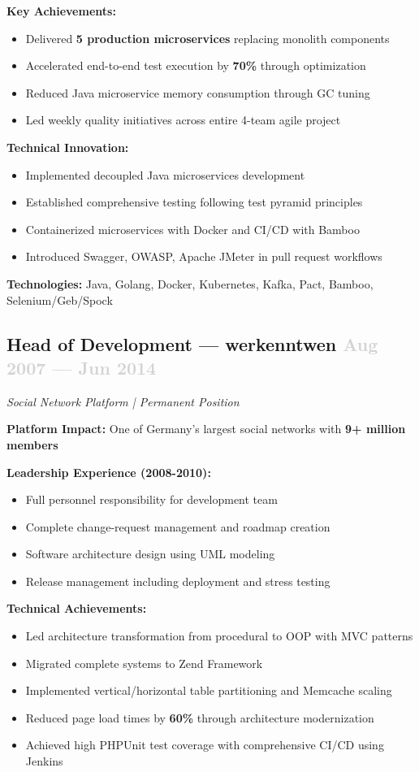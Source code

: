 \documentclass[11pt,a4paper]{article}
\begin{document}
\textbf{Key Achievements:}
\begin{itemize}
    \item Delivered \textbf{5 production microservices} replacing monolith components
    \item Accelerated end-to-end test execution by \textbf{70\%} through optimization
    \item Reduced Java microservice memory consumption through GC tuning
    \item Led weekly quality initiatives across entire 4-team agile project
\end{itemize}

\textbf{Technical Innovation:}
\begin{itemize}
    \item Implemented decoupled Java microservices development
    \item Established comprehensive testing following test pyramid principles
    \item Containerized microservices with Docker and CI/CD with Bamboo
    \item Introduced Swagger, OWASP, Apache JMeter in pull request workflows
\end{itemize}

\textbf{Technologies:} Java, Golang, Docker, Kubernetes, Kafka, Pact, Bamboo, Selenium/Geb/Spock

\subsection{Head of Development — werkenntwen \hfill \textcolor{lightgray}{Aug 2007 — Jun 2014}}
\textsl{Social Network Platform | Permanent Position}

\textbf{Platform Impact:} One of Germany's largest social networks with \textbf{9+ million members}

\textbf{Leadership Experience (2008-2010):}
\begin{itemize}
    \item Full personnel responsibility for development team
    \item Complete change-request management and roadmap creation
    \item Software architecture design using UML modeling
    \item Release management including deployment and stress testing
\end{itemize}

\textbf{Technical Achievements:}
\begin{itemize}
    \item Led architecture transformation from procedural to OOP with MVC patterns
    \item Migrated complete systems to Zend Framework
    \item Implemented vertical/horizontal table partitioning and Memcache scaling
    \item Reduced page load times by \textbf{60\%} through architecture modernization
    \item Achieved high PHPUnit test coverage with comprehensive CI/CD using Jenkins
\end{itemize}
\end{document}
